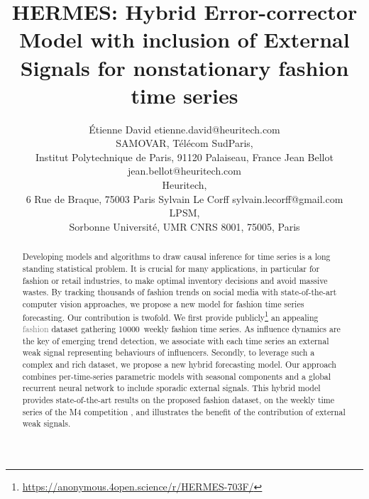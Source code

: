 \documentclass[10pt]{article} %
\title{HERMES: Hybrid Error-corrector Model with inclusion of External Signals for nonstationary fashion time series}
\author{\name \'Etienne David \email etienne.david@heuritech.com \\
      \addr SAMOVAR, Télécom SudParis,\\
      Institut Polytechnique de Paris, 91120 Palaiseau, France
      \AND
      \name Jean Bellot \email jean.bellot@heuritech.com \\
      \addr Heuritech, \\
      6 Rue de Braque, 75003 Paris
      \AND
      \name Sylvain Le Corff \email sylvain.lecorff@gmail.com\\
      \addr LPSM, \\
      Sorbonne Université, UMR CNRS 8001, 75005, Paris
      }
\newcommand{\numberts}{10000}
\begin{document}
\maketitle

\begin{abstract}
Developing models and algorithms to draw causal inference for time series is a long standing statistical problem. It is crucial for many applications, in particular for fashion or retail industries, to make optimal inventory decisions and avoid massive wastes. By tracking thousands of fashion trends on social media with state-of-the-art computer vision approaches, we propose a new model for fashion time series forecasting. Our contribution is  twofold. We first provide publicly\footnote[1]{\url{https://anonymous.4open.science/r/HERMES-703F/}} an appealing \textcolor{gray}{fashion} dataset gathering \numberts\ weekly fashion time series. As influence dynamics are the key of emerging trend detection, we associate with each time series an external weak signal representing behaviours of influencers. Secondly, to leverage such a complex and rich dataset, we propose a new hybrid forecasting model\footnotemark. Our approach combines per-time-series parametric models with seasonal components and a global recurrent neural network to include sporadic external signals. This hybrid model provides state-of-the-art results on the proposed fashion dataset, on the weekly time series of the M4 competition \citep{makridakis2018}, and illustrates the benefit of the contribution of external weak signals.
\end{abstract}
\end{document}
